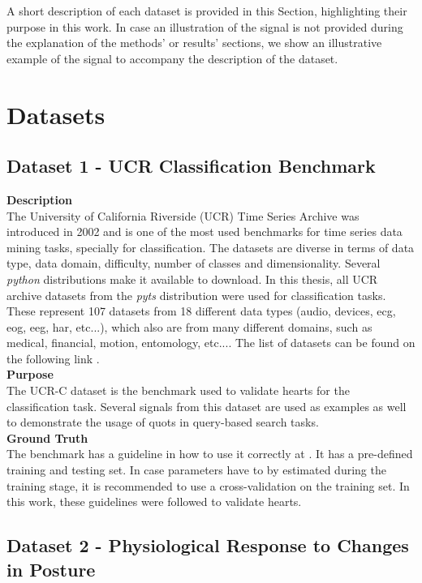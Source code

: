 A short description of each dataset is provided in this Section, highlighting their purpose in this work. In case an illustration of the signal is not provided during the explanation of the methods' or results' sections, we show an illustrative example of the signal to accompany the description of the dataset.

\section{Datasets}
\label{sec:dataset}

\subsection{Dataset 1 - UCR Classification Benchmark}
\label{sec:dat_ucr}
\textbf{Description}\hfill\\
The University of California Riverside (UCR) Time Series Archive was introduced in 2002 and is one of the most used benchmarks for time series data mining tasks, specially for classification. The datasets are diverse in terms of data type, data domain, difficulty, number of classes and dimensionality\cite{ucr}. Several \textit{python} distributions make it available to download. In this thesis, all UCR archive datasets from the \textit{pyts} distribution were used for classification tasks. These represent 107 datasets from 18 different data types (audio, devices, \gls{ecg}, \gls{eog}, \gls{eeg}, \gls{har}, etc...), which also are from many different domains, such as medical, financial, motion, entomology, etc...\cite{ucr}. The list of datasets can be found on the following link \cite{ucr_site}.\\
\textbf{Purpose}\hfill\\
The UCR-C dataset is the benchmark used to validate \gls{hearts} for the classification task. Several signals from this dataset are used as examples as well to demonstrate the usage of \gls{quots} in query-based search tasks.\\
\textbf{Ground Truth}\hfill\\
The benchmark has a guideline in how to use it correctly at \cite{ucr}. It has a pre-defined training and testing set. In case parameters have to by estimated during the training stage, it is recommended to use a cross-validation on the training set. In this work, these guidelines were followed to validate \gls{hearts}.

\subsection{Dataset 2 - Physiological Response to Changes in Posture}
\label{dat:dataset2}

